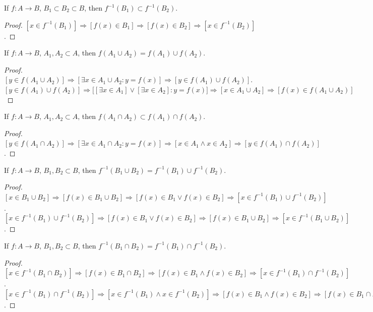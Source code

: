 \documentclass[crop=false,class=book,oneside]{standalone}
\begin{document}
        \begin{corollary}
        If $f:A\rightarrow B$, $B_1\subset B_2\subset B$, then $f^{-1}(B_1)\subset f^{-1}(B_2)$.
        \end{corollary}
        \begin{proof}
        $[x\in f^{-1}(B_1)] \Rightarrow [f(x) \in B_1] \Rightarrow [f(x) \in B_2]\Rightarrow [x\in f^{-1}(B_2)]$.
        \end{proof}
        \begin{theorem}
        If $f:A\rightarrow B$, $A_1,A_2\subset A$, then $f(A_1 \cup A_2) = f(A_1)\cup f(A_2)$.
        \end{theorem}
        \begin{proof}
        $[y\in f(A_1\cup A_2)]\Rightarrow [\exists x\in A_1 \cup A_2:y=f(x)]\Rightarrow [y \in f(A_1)\cup f(A_2)]$. $[y\in f(A_1)\cup f(A_2)]\Rightarrow \big[[\exists x\in A_1] \lor [\exists x\in A_2]: y=f(x)\big]\Rightarrow [x\in A_1\cup A_2]\Rightarrow [f(x)\in f(A_1\cup A_2)]$
        \end{proof}
        \begin{theorem}
        If $f:A\rightarrow B$, $A_1,A_2\subset A$, then $f(A_1\cap A_2)\subset f(A_1)\cap f(A_2)$.
        \end{theorem}
        \begin{proof}
        $[y\in f(A_1 \cap A_2)]\Rightarrow [\exists x\in A_1 \cap A_2:y=f(x)]\Rightarrow [x\in A_1 \land x \in A_2] \Rightarrow[y \in f(A_1)\cap f(A_2)]$.
        \end{proof}
        \begin{theorem}
        If $f:A\rightarrow B$, $B_1,B_2\subset B$, then $f^{-1}(B_1\cup B_2) = f^{-1}(B_1)\cup f^{-1}(B_2)$.
        \end{theorem}
        \begin{proof}
        $[x\in B_1\cup B_2]\Rightarrow [f(x)\in B_1\cup B_2]\Rightarrow [f(x)\in B_1\lor f(x)\in B_2]\Rightarrow [x\in f^{-1}(B_1)\cup f^{-1}(B_2)]$. $[x \in f^{-1}(B_1)\cup f^{-1}(B_2)]\Rightarrow [f(x)\in B_1\lor f(x) \in B_2]\Rightarrow [f(x) \in B_1\cup B_2]\Rightarrow [x\in f^{-1}(B_1\cup B_2)]$.
        \end{proof}
        \begin{theorem}
        If $f:A\rightarrow B$, $B_1,B_2\subset B$, then $f^{-1}(B_1\cap B_2) = f^{-1}(B_1)\cap f^{-1}(B_2)$.
        \end{theorem}
        \begin{proof}
        $[x\in f^{-1}(B_1\cap B_2)]\Rightarrow [f(x) \in B_1 \cap B_2]\Rightarrow [f(x)\in B_1\land f(x) \in B_2 ]\Rightarrow [x\in f^{-1}(B_1)\cap f^{-1}(B_2)]$. $[x\in f^{-1}(B_1)\cap f^{-1}(B_2)]\Rightarrow [x\in f^{-1}(B_1)\land x\in f^{-1}(B_2)]\Rightarrow [f(x) \in B_1\land f(x) \in B_2]\Rightarrow [f(x)\in B_1\cap B_2]\Rightarrow [x\in f^{-1}(B_1\cap B_2)]$.
        \end{proof}
\end{document}

